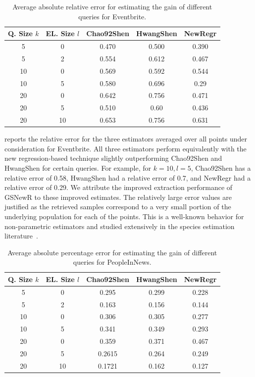 \begin{table}[h]
\center
\caption{Average absolute relative error for estimating the gain of different queries for Eventbrite.}
\label{tab:eventesterror}
\begin{tabular}{|c|c|c|c|c|}
\hline
\textbf{Q. Size $k$} & \textbf{EL. Size $l$} & \textbf{Chao92Shen} & \textbf{HwangShen} & \textbf{NewRegr} \\ \hline
5 & 0 & 0.470 & 0.500 & 0.390 \\
5 & 2 & 0.554 & 0.612 & 0.467\\
10 & 0 & 0.569 & 0.592 & 0.544\\
10 & 5 & 0.580 & 0.696 & 0.29\\
20 & 0 & 0.642 & 0.756 &0.471\\
20 & 5 & 0.510 & 0.60 & 0.436 \\
20 & 10 & 0.653 & 0.756 & 0.631\\
\hline
\end{tabular}
\end{table}

 reports the relative error for the three estimators averaged over all points under consideration for Eventbrite. All three estimators perform equivalently with the new regression-based technique slightly outperforming Chao92Shen and HwangShen for certain queries. For example, for $k = 10, l = 5$, Chao92Shen has a relative error of 0.58, HwangShen had a relative error of 0.7, and NewRegr had a relative error of 0.29. We attribute the improved extraction performance of GSNewR to these improved estimates. The relatively large error values are justified as the retrieved samples correspond to a very small portion of the underlying population for each of the points. This is a well-known behavior for non-parametric estimators and studied extensively in the species estimation literature~\cite{hwang:2010}.

\begin{table}[h]
\center
\caption{Average absolute percentage error for estimating the gain of different queries for PeopleInNews.}
\label{tab:peopleesterror}
\begin{tabular}{|c|c|c|c|c|}
\hline
\textbf{Q. Size $k$} & \textbf{EL. Size $l$} & \textbf{Chao92Shen} & \textbf{HwangShen} & \textbf{NewRegr} \\ \hline
5 & 0 & 0.295 & 0.299 & 0.228\\
5 & 2 & 0.163 &  0.156 & 0.144\\
10 & 0 &  0.306 & 0.305 & 0.277\\
10 & 5 &  0.341 & 0.349 & 0.293\\
20 & 0 &  0.359& 0.371 & 0.467 \\
20 & 5 &  0.2615 & 0.264 & 0.249\\
20 & 10 & 0.1721 & 0.162 & 0.127\\
\hline
\end{tabular}
\end{table}


